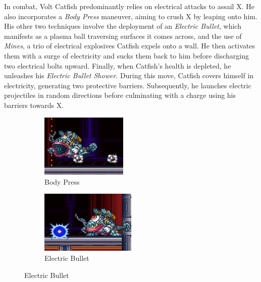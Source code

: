 In combat, Volt Catfish predominantly relies on electrical attacks to assail X. He also incorporates a \emph{Body Press} maneuver, aiming to crush X by leaping onto him. His other two techniques involve the deployment of an \emph{Electric Bullet}, which manifests as a plasma ball traversing surfaces it comes across, and the use of \emph{Mines}, a trio of electrical explosives Catfish expels onto a wall. He then activates them with a surge of electricity and sucks them back to him before discharging two electrical bolts upward. Finally, when Catfish's health is depleted, he unleashes his \emph{Electric Bullet Shower}. During this move, Catfish covers himself in electricity, generating two protective barriers. Subsequently, he launches electric projectiles in random directions before culminating with a charge using his barriers towards X.
\begin{figure}[htp]
	\centering
	\begin{subfigure}{.4\linewidth}
		\centering
		\includegraphics[height=3cm]{figures/X3/Volt_catfish/catfish_flop.jpg}
		\caption{Body Press}
	\end{subfigure}
	\begin{subfigure}{.4\linewidth}
		\centering
		\includegraphics[height=3cm]{figures/X3/Volt_catfish/catfish_bullet.jpg}
		\caption{Electric Bullet}
	\end{subfigure}
	

\end{figure}

